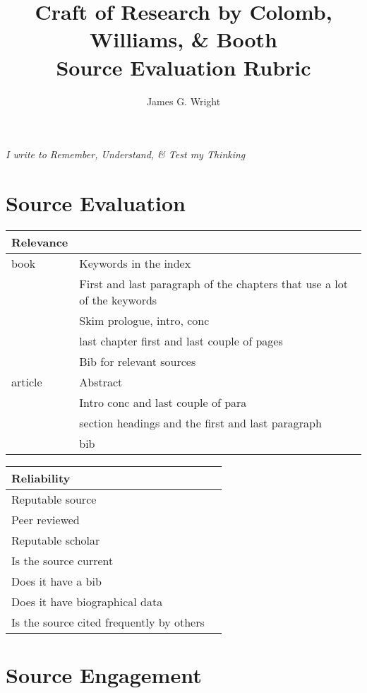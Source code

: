 \documentclass[10pt, a4paper]{article}
\begin{document}
	\title{Craft of Research by Colomb, Williams, \& Booth\cite{booth2009craft}
		\\Source Evaluation Rubric}
	\author{James G. Wright }
	\maketitle
	\begin{center}
		\emph{I write to Remember, Understand, \& Test my Thinking}
	\end{center}
	
	\newpage
\section{Source Evaluation}

	\begin{tabular}{|l |l|}
		\hline
		Relevance &\\
		\hline
		book &Keywords in the index\\
		&First and last paragraph of the chapters that use a lot of the keywords\\
		&Skim prologue, intro, conc\\
		&last chapter first and last couple of pages\\
		&Bib for relevant sources\\
		\hline
		article & Abstract\\
		&Intro conc and last couple of para\\
		&section headings and the first and last paragraph\\
		&bib\\
		\hline		
	\end{tabular}

	\begin{tabular}{|l |l|}
		\hline
		Reliability&\\
		\hline
		Reputable source&\\
		\hline
		Peer reviewed&\\
		\hline
		Reputable scholar&\\
		\hline
		Is the source current&\\
		\hline
		Does it have a bib&\\
		\hline
		Does it have biographical data&\\
		\hline
		Is the source cited frequently by others&\\
		\hline
	\end{tabular}

\section{Source Engagement}
\end{document}
